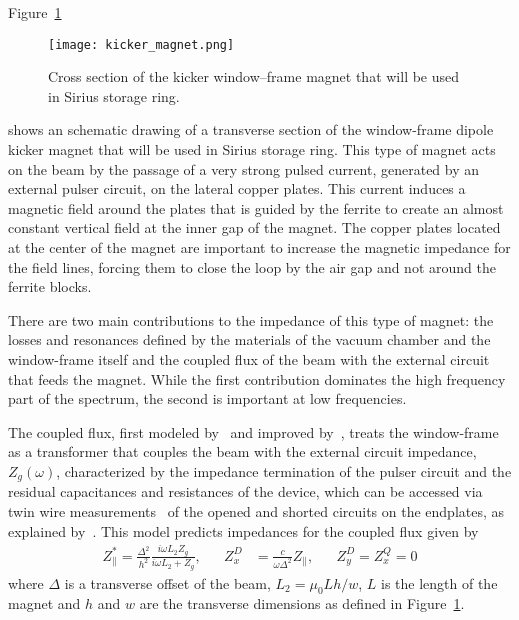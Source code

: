     Figure~\ref{fig:kicker_magnet}
    \begin{figure}
        \centering
        \texttt{[image: kicker\_magnet.png]}
        \caption{Cross section of the kicker window--frame magnet that will be used in Sirius storage ring.}
        \label{fig:kicker_magnet}
    \end{figure}
    shows an schematic drawing of a transverse section of the window-frame dipole kicker magnet that will be used in Sirius storage ring. This type of magnet acts on the beam by the passage of a very strong pulsed current, generated by an external pulser circuit, on the lateral copper plates. This current induces a magnetic field around the plates that is guided by the ferrite to create an almost constant vertical field at the inner gap of the magnet. The copper plates located at the center of the magnet are important to increase the magnetic impedance for the field lines, forcing them to close the loop by the air gap and not around the ferrite blocks.

    There are two main contributions to the impedance of this type of magnet: the losses and resonances defined by the materials of the vacuum chamber and the window-frame itself and the coupled flux of the beam with the external circuit that feeds the magnet. While the first contribution dominates the high frequency part of the spectrum, the second is important at low frequencies.

    The coupled flux, first modeled by~ and improved by~, treats the window-frame as a transformer that couples the beam with the external circuit impedance, $Z_g(\omega)$, characterized by the impedance termination of the pulser circuit and the residual capacitances and resistances of the device, which can be accessed via twin wire measurements~\cite{Mostacci2016} of the opened and shorted circuits on the endplates, as explained by~. This model predicts impedances for the coupled flux given by
    \begin{align}\label{eq:coupled_flux_impedance}
        Z_\parallel^* = \frac{\Delta^2}{h^2}\frac{i\omega L_2 Z_g}{i\omega L_2 + Z_g},
        & & Z_x^D &= \frac{c}{\omega\Delta^2}Z_\parallel, & & Z^D_y=Z^Q_x = 0
    \end{align}
    where $\Delta$ is a transverse offset of the beam, $L_2 = \mu_0Lh/w$, $L$ is the length of the magnet and $h$ and $w$ are the transverse dimensions as defined in Figure~\ref{fig:kicker_magnet}.

